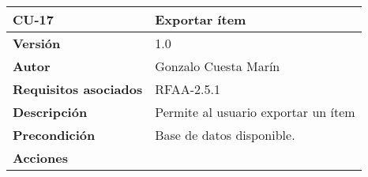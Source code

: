 \begin{longtable}[]{@{}ll@{}}
\toprule
\begin{minipage}[b]{0.25\columnwidth}\raggedright
\textbf{CU-17}\strut
\end{minipage} & \begin{minipage}[b]{0.69\columnwidth}\raggedright
\textbf{Exportar ítem}\strut
\end{minipage}\tabularnewline
\midrule
\endhead
\begin{minipage}[t]{0.25\columnwidth}\raggedright
\textbf{Versión}\strut
\end{minipage} & \begin{minipage}[t]{0.69\columnwidth}\raggedright
1.0\strut
\end{minipage}\tabularnewline
\begin{minipage}[t]{0.25\columnwidth}\raggedright
\textbf{Autor}\strut
\end{minipage} & \begin{minipage}[t]{0.69\columnwidth}\raggedright
Gonzalo Cuesta Marín\strut
\end{minipage}\tabularnewline
\begin{minipage}[t]{0.25\columnwidth}\raggedright
\textbf{Requisitos asociados}\strut
\end{minipage} & \begin{minipage}[t]{0.69\columnwidth}\raggedright
RFAA-2.5.1\strut
\end{minipage}\tabularnewline
\begin{minipage}[t]{0.25\columnwidth}\raggedright
\textbf{Descripción}\strut
\end{minipage} & \begin{minipage}[t]{0.69\columnwidth}\raggedright
Permite al usuario exportar un ítem\strut
\end{minipage}\tabularnewline
\begin{minipage}[t]{0.25\columnwidth}\raggedright
\textbf{Precondición}\strut
\end{minipage} & \begin{minipage}[t]{0.69\columnwidth}\raggedright
Base de datos disponible.\strut
\end{minipage}\tabularnewline
\begin{minipage}[t]{0.25\columnwidth}\raggedright
\textbf{Acciones}\strut
\end{minipage} & \begin{minipage}[t]{0.69\columnwidth}\raggedright
\begin{enumerate}
\def\labelenumi{\arabic{enumi}.}

\end{enumerate}
\end{minipage}
\end{longtable}
